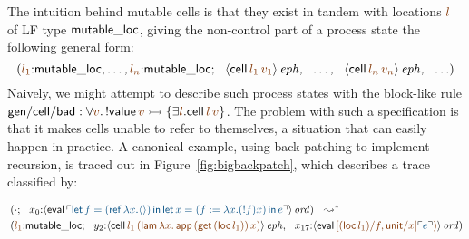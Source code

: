 The intuition behind mutable cells is that they exist in 
tandem with locations $\lf{l}$ of LF type ${\sf mutable\_loc}$,
giving the non-control part of a process state the following
general form:
\[\left(\lf{l_1}{:}{\sf mutable\_loc},\ldots,\lf{l_n}{:}{\sf mutable\_loc};
  ~~ \iseph{\susp{{\sf cell}\,\lf{l_1}\,\lf{v_1}}}, 
  ~~ \ldots, 
  ~~ \iseph{\susp{{\sf cell}\,\lf{l_n}\,\lf{v_n}}}, 
  ~~ \ldots\right)\]
%
Naively, we might attempt to describe such process 
states with the block-like rule 
${\sf gen/cell/bad} : \forall \lf{v}.\, {!}{\sf
  value}\,\lf{v} \lefti \{ \exists \lf{l}. {\sf cell}\,\lf{l}\,\lf{v}
\}$. The problem with such a specification is that it makes 
cells unable to refer to themselves, a situation that can easily
happen in practice. A canonical example, using back-patching to
implement recursion, is traced out 
in Figure~\ref{fig:bigbackpatch}, which
describes a trace classified by:

{\small\begin{align*}
&
\left(\cdot; ~~
 x_0{:}\istrue{\susp{{\sf eval}\,
  \interp{{\sf let}\,f = ({\sf ref}\,\lambda x. \langle\rangle) \,{\sf in}\,
          {\sf let}\,x = (f := \lambda x. ({!}f) x)\,{\sf in}\,e}}}
\right) ~~ \leadsto^*
\\
& 
\left(
\lf{l_1}{:}{\sf mutable\_loc}; ~~
y_2{:}\iseph{\susp{{\sf cell}\,\lf{l_1}\,
  \lf{({\sf lam}\,\lambda x.\,{\sf app}\,({\sf get}\,({\sf loc}\,l_1))\,x)}}},
 ~~
x_{17}{:}\istrue{\susp{{\sf eval}\,
  \lf{[({\sf loc}\,l_1)/f, {\sf unit}/x]\interp{e})}}}
\right)
\end{align*}}


